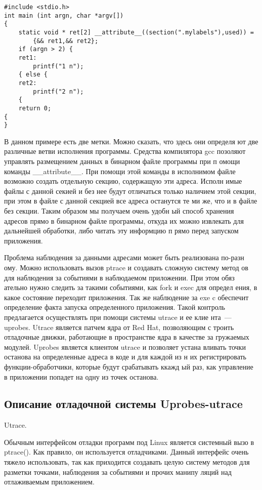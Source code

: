 \bigskip
\begin{lstlisting}
#include <stdio.h>
int main (int argn, char *argv[])
{ 
	static void * ret[2] __attribute__((section(".mylabels"),used)) = 
		{&& ret1,&& ret2};
	if (argn > 2) {
	ret1:
		printf("1 n");
	{ else {
	ret2:
		printf("2 n");
	{
	return 0;
{ 
}
\end{lstlisting}
\bigskip
В данном примере есть две метки. Можно сказать, что здесь они определя
ют две различные ветви исполнения программы. Средства компилятора gcc 
позоляют управлять размещением данных в бинарном файле программы при п
омощи команды \_\_attribute\_\_. При помощи этой команды в исполнимом 
файле возможно создать отдельную секцию, содержащую эти адреса. Исполн
имые файлы с данной секией и без нее будут отличаться только наличием 
этой секции, при этом в файле с данной секцией все адреса останутся те
ми же, что и в файле без секции. Таким образом мы получаем очень удобн
ый способ хранения адресов прямо в бинарном файле программы, откуда их
 можно извлекать для дальнейшей обработки, либо читать эту информцию п
рямо перед запуском приложения.

Проблема наблюдения за данными адресами может быть реализована по-разн
ому. Можно использовать вызов ptrace и создавать сложную систему метод
ов для наблюдения за событиями в наблюдаемом приложении. При этом обяз
ательно нужно следить за такими событиями, как fork и exec для определ
ения, в какое состояние переходит приложения. Так же наблюдение за exe
c обеспечит определение факта запуска определенного приложения. Такой 
контроль предлагается осуществлять при помощи системы utrace и ее клие
нта~--- uprobes. Utrace является патчем ядра от Red Hat, позволяющим с
троить отладочные движки, работающие в пространстве ядра в качестве за
гружаемых модулей. Uprobes является клиентом utrace и позволяет устана
вливать точки останова на определенные адреса в коде и для каждой из н
их регистрировать функции-обработчики, которые будут срабатывать ккажд
ый раз, как управление в приложении попадет на одну из точек останова.
 

\bigskip
\subsection{Описание отладочной системы Uprobes-utrace}

\bigskip
Utrace.

\bigskip
Обычным интерфейсом отладки программ под Linux является системный вызо
в ptrace(). Как правило, он используется отладчиками. Данный интерфейс
 очень тяжело использовать, так как приходится создавать целую систему
 методов для разметки точками, наблюдения за событиями и прочих манипу
ляций над отлаживаемым приложением. 

